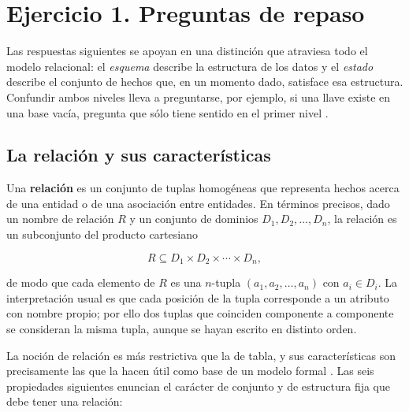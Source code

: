
\section{Ejercicio 1. Preguntas de repaso}

Las respuestas siguientes se apoyan en una distinción que atraviesa todo el
modelo relacional: el \emph{esquema} describe la estructura de los datos y el
\emph{estado} describe el conjunto de hechos que, en un momento dado,
satisface esa estructura. Confundir ambos niveles lleva a preguntarse, por
ejemplo, si una llave existe en una base vacía, pregunta que sólo tiene
sentido en el primer nivel \cite{elmasri2016fundamentals}.

\subsection{La relación y sus características}

Una \textbf{relación} es un conjunto de tuplas homogéneas que representa
hechos acerca de una entidad o de una asociación entre entidades. En términos
precisos, dado un nombre de relación $R$ y un conjunto de dominios $D_1, D_2,
\ldots, D_n$, la relación es un subconjunto del producto cartesiano

\begin{equation}
  R \subseteq D_1 \times D_2 \times \cdots \times D_n,
\end{equation}

de modo que cada elemento de $R$ es una $n$-tupla $(a_1, a_2, \ldots, a_n)$
con $a_i \in D_i$. La interpretación usual es que cada posición de la tupla
corresponde a un atributo con nombre propio; por ello dos tuplas que coinciden
componente a componente se consideran la misma tupla, aunque se hayan escrito
en distinto orden.

La noción de relación es más restrictiva que la de tabla, y sus
características son precisamente las que la hacen útil como base de un modelo
formal \cite{codd1970relational}. Las seis propiedades siguientes enuncian el
carácter de conjunto y de estructura fija que debe tener una relación:

